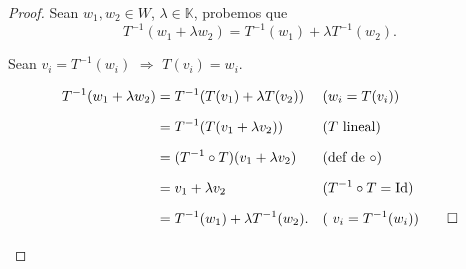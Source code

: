 \documentclass[handout]{beamer} %
\newcommand{\Id}{\operatorname{Id}}
\newcommand{\K}{\mathbb K}
\begin{document}
    
  

    \begin{frame}
        \begin{proof}
            Sean $w_1, w_2 \in W$, $\lambda \in \K$,  probemos que $$T^{-1}(w_1+ \lambda w_2) =  T^{-1}(w_1)+ \lambda T^{-1}(w_2).$$ 
                
            Sean $v_i = T^{-1}(w_i) $ $\Rightarrow$  $T(v_i) = w_i$.

            \begin{align*}
                T^{-1}(w_1  + \lambda w_2) &= T^{-1}(T(v_1)+\lambda T(v_2)) &&\text{($w_i= T(v_i)$)}\\\noalign{\vskip.2cm}
                &= T^{-1}(T(v_1+\lambda v_2)) &&\text{($T$ lineal)}\\\noalign{\vskip.2cm}
                &=(T^{-1}\circ T)(v_1+\lambda v_2) &&\text{(def de $\circ$)}\\\noalign{\vskip.2cm}
                &= v_1+\lambda v_2 &&\text{($T^{-1}\circ T =\Id$)}\\\noalign{\vskip.2cm}
                &= T^{-1}(w_1)+ \lambda T^{-1}(w_2). &&\text{( $v_i = T^{-1}(w_i) $)} \qed \\\noalign{\vskip.2cm}
            \end{align*}
           
        \end{proof}
       
    \end{frame}
\end{document}
